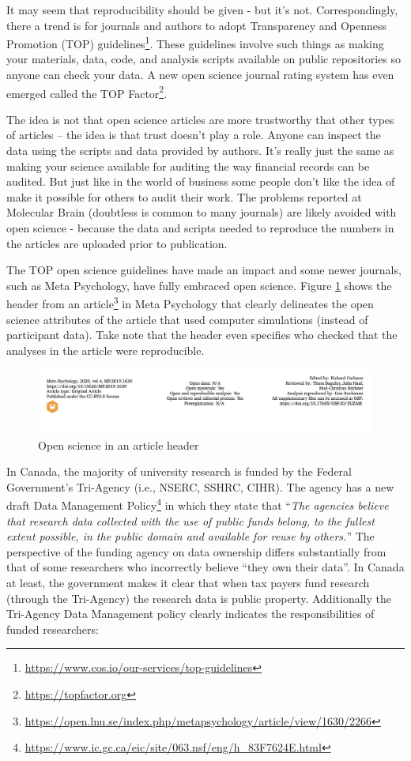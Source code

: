 \documentclass[
]{krantz}
\renewcommand{\href}[2]{#2\footnote{\url{#1}}}
\begin{document}
It may seem that reproducibility should be given - but it's not. Correspondingly, there a trend is for journals and authors to adopt Transparency and Openness Promotion (TOP) \href{https://www.cos.io/our-services/top-guidelines}{guidelines}. These guidelines involve such things as making your materials, data, code, and analysis scripts available on public repositories so anyone can check your data. A new open science journal rating system has even emerged called the \href{https://topfactor.org}{TOP Factor}.

The idea is not that open science articles are more trustworthy that other types of articles -- the idea is that trust doesn't play a role. Anyone can inspect the data using the scripts and data provided by authors. It's really just the same as making your science available for auditing the way financial records can be audited. But just like in the world of business some people don't like the idea of make it possible for others to audit their work. The problems reported at Molecular Brain (doubtless is common to many journals) are likely avoided with open science - because the data and scripts needed to reproduce the numbers in the articles are uploaded prior to publication.

The TOP open science guidelines have made an impact and some newer journals, such as Meta Psychology, have fully embraced open science. Figure \ref{fig:metapsychology} shows the header from an \href{https://open.lnu.se/index.php/metapsychology/article/view/1630/2266}{article} in Meta Psychology that clearly delineates the open science attributes of the article that used computer simulations (instead of participant data). Take note that the header even specifies who checked that the analyses in the article were reproducible.

\begin{figure}
\includegraphics[width=1\linewidth]{ch_enter_load/images/screenshot_metapsychology} \caption{Open science in an article header}\label{fig:metapsychology}
\end{figure}

In Canada, the majority of university research is funded by the Federal Government's Tri-Agency (i.e., NSERC, SSHRC, CIHR). The agency has a new draft \href{https://www.ic.gc.ca/eic/site/063.nsf/eng/h_83F7624E.html}{Data Management Policy} in which they state that ``\emph{The agencies believe that research data collected with the use of public funds belong, to the fullest extent possible, in the public domain and available for reuse by others.}'' The perspective of the funding agency on data ownership differs substantially from that of some researchers who incorrectly believe ``they own their data''. In Canada at least, the government makes it clear that when tax payers fund research (through the Tri-Agency) the research data is public property. Additionally the Tri-Agency Data Management policy clearly indicates the responsibilities of funded researchers:
\end{document}
